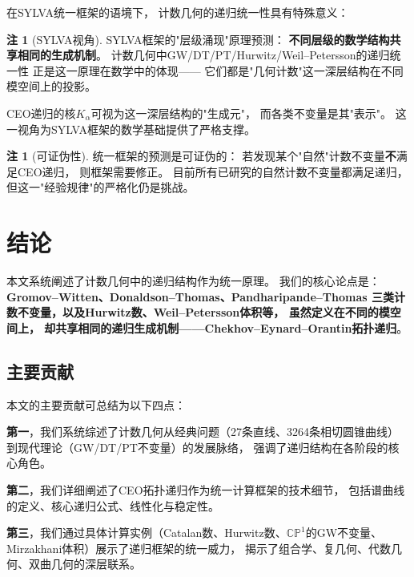 \documentclass[11pt,a4paper]{article}
\theoremstyle{plain}
\theoremstyle{definition}
\newtheorem{remark}[theorem]{注}
\newcommand{\CP}{\mathbb{CP}}
\begin{document}
在SYLVA统一框架的语境下，
计数几何的递归统一性具有特殊意义：

\begin{remark}[SYLVA视角]\label{rmk:sylva}
SYLVA框架的"层级涌现"原理预测：
\textbf{不同层级的数学结构共享相同的生成机制}。
计数几何中GW/DT/PT/Hurwitz/Weil--Petersson的递归统一性
正是这一原理在数学中的体现——
它们都是"几何计数"这一深层结构在不同模空间上的投影。

CEO递归的核$K_\alpha$可视为这一深层结构的"生成元"，
而各类不变量是其"表示"。
这一视角为SYLVA框架的数学基础提供了严格支撑。
\end{remark}

\begin{remark}[可证伪性]\label{rmk:falsifiable}
统一框架的预测是可证伪的：
若发现某个"自然"计数不变量\textbf{不}满足CEO递归，
则框架需要修正。
目前所有已研究的自然计数不变量都满足递归，
但这一"经验规律"的严格化仍是挑战。
\end{remark}




\section{结论}\label{sec:conclusion}

本文系统阐述了计数几何中的递归结构作为统一原理。
我们的核心论点是：
\textbf{Gromov--Witten、Donaldson--Thomas、Pandharipande--Thomas
三类计数不变量，以及Hurwitz数、Weil--Petersson体积等，
虽然定义在不同的模空间上，
却共享相同的递归生成机制——Chekhov--Eynard--Orantin拓扑递归}。

\subsection{主要贡献}

本文的主要贡献可总结为以下四点：

\textbf{第一}，我们系统综述了计数几何从经典问题（27条直线、3264条相切圆锥曲线）
到现代理论（GW/DT/PT不变量）的发展脉络，
强调了递归结构在各阶段的核心角色。

\textbf{第二}，我们详细阐述了CEO拓扑递归作为统一计算框架的技术细节，
包括谱曲线的定义、核心递归公式、线性化与稳定性。

\textbf{第三}，我们通过具体计算实例（Catalan数、Hurwitz数、$\CP^1$的GW不变量、
Mirzakhani体积）展示了递归框架的统一威力，
揭示了组合学、复几何、代数几何、双曲几何的深层联系。
\end{document}
